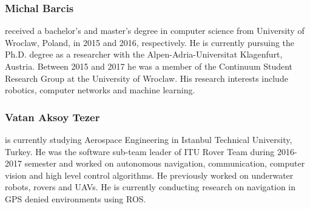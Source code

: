 \documentclass[runningheads,a4paper]{llncs}
\begin{document}
\subsubsection*{Michal Barcis} received a bachelor's and master's degree in computer science from University of Wroclaw, Poland, in 2015 and 2016, respectively. He is currently pursuing the Ph.D. degree as a researcher with the Alpen-Adria-Universitat Klagenfurt, Austria. Between 2015 and 2017 he was a member of the Continuum Student Research Group at the University of Wroclaw. His research interests include robotics, computer networks and machine learning.

\subsubsection*{Vatan Aksoy Tezer} is currently studying Aerospace Engineering in Istanbul Technical University, Turkey. He was the software sub-team leader of ITU Rover Team during 2016-2017 semester and worked on autonomous navigation, communication, computer vision and high level control algorithms. He previously worked on underwater robots, rovers and UAVs. He is currently conducting research on navigation in GPS denied environments using ROS.

 
\end{document}

